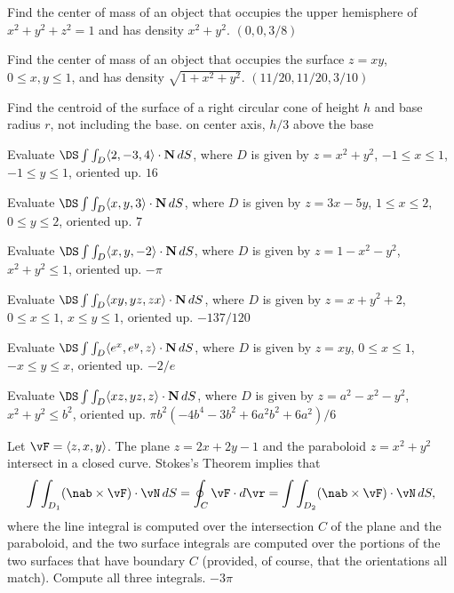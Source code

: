 \begin{multicols}{2}
\problem Find the center of mass of an object that occupies the upper %
hemisphere of $x^2+y^2+z^2=1$ and has density $x^2+y^2$.
\answer
$(0,0,3/8)$
\endanswer

\problem Find the center of mass of an object that occupies the %
surface $z=xy$, $0\le x,y\le 1$, and has density $\sqrt{1+x^2+y^2}$.
\answer
$(11/20,11/20,3/10)$
\endanswer

\problem Find the centroid of the surface of a right circular cone of %
height $h$ and base radius $r$, not including the base.
\answer
on center axis, $h/3$ above the base
\endanswer

\problem Evaluate $\DS \dint{D} \langle 2,-3,4\rangle\cdot {\bf %
N}\,dS$, where $D$ is given by $z=x^2+y^2$, $-1\le x\le 1$, $-1\le
y\le 1$, oriented up.
\answer
$16$
\endanswer

\problem Evaluate $\DS \dint{D} \langle x,y,3\rangle\cdot {\bf %
N}\,dS$, where $D$ is given by $z=3x-5y$, $1\le x\le 2$, $0\le
y\le 2$, oriented up.
\answer
$7$
\endanswer

\problem Evaluate $\DS \dint{D} \langle x,y,-2\rangle\cdot {\bf %
N}\,dS$, where $D$ is given by $z=1-x^2-y^2$, $x^2+y^2\le1$,
oriented up.
\answer
$-\pi$
\endanswer

\problem Evaluate $\DS \dint{D} \langle xy, yz,zx\rangle\cdot {\bf %
N}\,dS$, where $D$ is given by $z=x+y^2+2$, $0\le x\le 1$, $x\le
y\le 1$, oriented up.
\answer
$-137/120$
\endanswer

\problem Evaluate $\DS \dint{D} \langle e^x, e^y,z\rangle\cdot {\bf %
N}\,dS$, where $D$ is given by $z=xy$, $0\le x\le 1$, $-x\le
y\le x$, oriented up.
\answer
$-2/e$
\endanswer

\problem Evaluate $\DS \dint{D} \langle xz,yz,z\rangle\cdot {\bf %
N}\,dS$, where $D$ is given by $z=a^2-x^2-y^2$, $x^2+y^2\le b^2$, 
oriented up.
\answer
$\pi b^2(-4b^4-3b^2+6a^2b^2+6a^2)/6$
\endanswer





\problem %
Let $\vF =\langle z,x,y\rangle$.
The plane $z=2x+2y-1$ and the paraboloid $z=x^2+y^2$ intersect in a
closed curve. Stokes's Theorem implies that
$$\dint{D_1} (\nab\times\vF )\cdot \vN \,dS=
\oint_C \vF \cdot d\vr =
\dint{D_2} (\nab\times\vF )\cdot \vN \,dS,
$$
where the line integral is computed over the intersection $C$ of the plane
and the paraboloid, and the two surface integrals are computed over
the portions of the two surfaces that have boundary $C$ (provided, of
course, that the orientations all match). Compute all three integrals.
\answer
$-3\pi$
\endanswer


\end{multicols}
